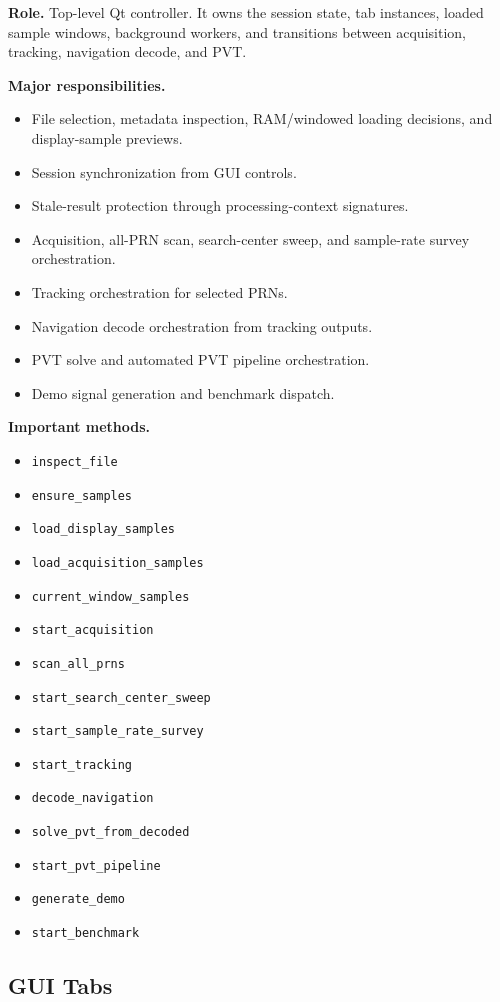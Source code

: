 \documentclass[11pt,a4paper]{article}
\newcommand{\codesym}[1]{\nolinkurl{#1}}
\newcommand{\apisym}[1]{\item \codesym{#1}}
\begin{document}
\textbf{Role.} Top-level Qt controller. It owns the session state, tab instances, loaded sample windows, background workers, and transitions between acquisition, tracking, navigation decode, and PVT.

\textbf{Major responsibilities.}
\begin{itemize}
  \item File selection, metadata inspection, RAM/windowed loading decisions, and display-sample previews.
  \item Session synchronization from GUI controls.
  \item Stale-result protection through processing-context signatures.
  \item Acquisition, all-PRN scan, search-center sweep, and sample-rate survey orchestration.
  \item Tracking orchestration for selected PRNs.
  \item Navigation decode orchestration from tracking outputs.
  \item PVT solve and automated PVT pipeline orchestration.
  \item Demo signal generation and benchmark dispatch.
\end{itemize}

\textbf{Important methods.}
\begin{itemize}
  \apisym{inspect_file}
  \apisym{ensure_samples}
  \apisym{load_display_samples}
  \apisym{load_acquisition_samples}
  \apisym{current_window_samples}
  \apisym{start_acquisition}
  \apisym{scan_all_prns}
  \apisym{start_search_center_sweep}
  \apisym{start_sample_rate_survey}
  \apisym{start_tracking}
  \apisym{decode_navigation}
  \apisym{solve_pvt_from_decoded}
  \apisym{start_pvt_pipeline}
  \apisym{generate_demo}
  \apisym{start_benchmark}
\end{itemize}

\subsection{GUI Tabs}
\end{document}
